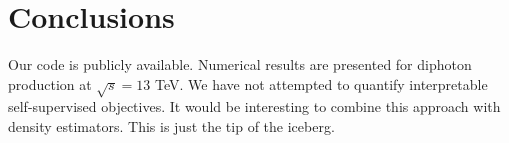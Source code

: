 \section{Conclusions}\label{sec:conclusions}

Our code is publicly available. Numerical results are presented for
diphoton production at $\sqrt{s} = 13$ TeV. We have not attempted to
quantify interpretable self-supervised objectives. It would be
interesting to combine this approach with density estimators. This is
just the tip of the iceberg.

